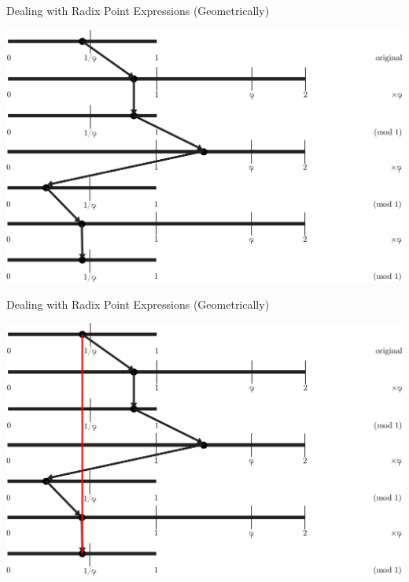 \documentclass{beamer}
\begin{document}
\begin{frame}{Dealing with Radix Point Expressions (Geometrically)}
  \addtocounter{framenumber}{-1}
  \begin{example}
    \includegraphics[width=\textwidth,height=0.75\textheight]{images/Phinary/7}
  \end{example}
\end{frame}

\begin{frame}{Dealing with Radix Point Expressions (Geometrically)}
  \addtocounter{framenumber}{-1}
  \begin{example}
    \includegraphics[width=\textwidth,height=0.75\textheight]{images/Phinary/8}
  \end{example}
\end{frame}
\end{document}
